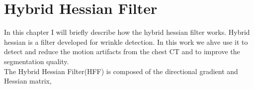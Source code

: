 \documentclass{standalone}
\begin{document}
		\chapter*{Hybrid Hessian Filter}
		
		In this chapter I will briefly describe how the hybrid hessian filter works. Hybrid hessian is a filter developed for wrinkle detection. In this work we ahve use it to detect and reduce the motion artifacts from the chest CT and to improve the segmentation quality.\\
		The Hybrid Hessian Filter(HFF) is composed of the directional gradient and Hessian matrix, 
\end{document}
